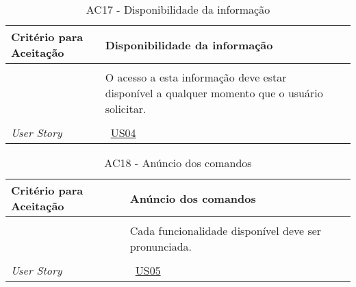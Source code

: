 \begin{apendicesenv}
\begin{table}[ht]
\begin{center}
\begin{tabularx}{\textwidth}{|lX|l|}
\end{tabularx}
\end{center}
\label{tab:us01a16}
\end{table}



\begin{table}[ht]
\centering
\caption{AC17 - Disponibilidade da informação}
\vspace{0.1cm}
\begin{center}
\begin{tabularx}{\textwidth}{|lX|l|}

\hline
\textbf{Critério para Aceitação} & Disponibilidade da informação \\
\hline
 & \\
 & O acesso a esta informação deve estar disponível a qualquer momento que o usuário solicitar. \\
 & \\
\hline
\textit{User Story} & ~\hyperref[tab:us04]{US04} \\
\hline

\end{tabularx}
\end{center}
\label{tab:us01a17}
\end{table}


\begin{table}[ht]
\centering
\caption{AC18 - Anúncio dos comandos}
\vspace{0.1cm}
\begin{center}
\begin{tabularx}{\textwidth}{|lX|l|}

\hline
\textbf{Critério para Aceitação} & Anúncio dos comandos \\
\hline
 & \\
 & Cada funcionalidade disponível deve ser pronunciada. \\
 & \\
\hline
\textit{User Story} & ~\hyperref[tab:us05]{US05} \\
\hline


\end{tabularx}
\end{center}
\end{table}
\end{apendicesenv}
